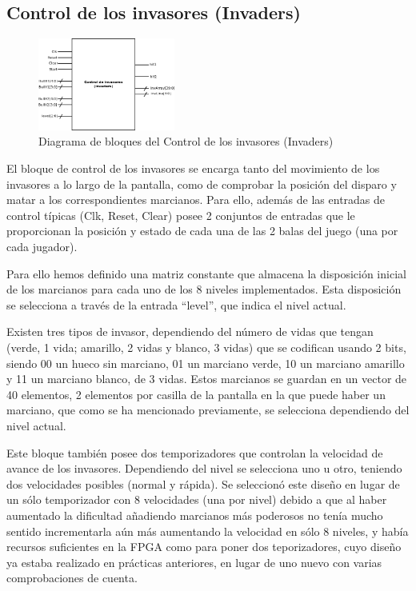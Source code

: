 \subsection{Control de los invasores (Invaders)}
\label{invaders}

\begin{figure}[H]
	\centering
	\includegraphics[width=0.4\textwidth]{invaders_block.png}
	\caption{Diagrama de bloques del Control de los invasores (Invaders) }\label{fig:invadersBlock}
\end{figure}

El bloque de control de los invasores se encarga tanto del movimiento de los invasores a lo largo de la pantalla, como de comprobar la posición del disparo y matar a los correspondientes marcianos. Para ello, además de las entradas de control típicas (Clk, Reset, Clear) posee 2 conjuntos de entradas que le proporcionan la posición y estado de cada una de las 2 balas del juego (una por cada jugador).

Para ello hemos definido una matriz constante que almacena la disposición inicial de los marcianos para cada uno de los 8 niveles implementados. Esta disposición se selecciona a través de la entrada ``level'', que indica el nivel actual.

Existen tres tipos de invasor, dependiendo del número de vidas que tengan (verde, 1 vida; amarillo, 2 vidas y blanco, 3 vidas) que se codifican usando 2 bits, siendo 00 un hueco sin marciano, 01 un marciano verde, 10 un marciano amarillo y 11 un marciano blanco, de 3 vidas. Estos marcianos se guardan en un vector de 40 elementos, 2 elementos por casilla de la pantalla en la que puede haber un marciano, que como se ha mencionado previamente, se selecciona dependiendo del nivel actual.

Este bloque también posee dos temporizadores que controlan la velocidad de avance de los invasores. Dependiendo del nivel se selecciona uno u otro, teniendo dos velocidades posibles (normal y rápida). Se seleccionó este diseño en lugar de un sólo temporizador con 8 velocidades (una por nivel) debido a que al haber aumentado la dificultad añadiendo marcianos más poderosos no tenía mucho sentido incrementarla aún más aumentando la velocidad en sólo 8 niveles, y había recursos suficientes en la FPGA como para poner dos teporizadores, cuyo diseño ya estaba realizado en prácticas anteriores, en lugar de uno nuevo con varias comprobaciones de cuenta.


